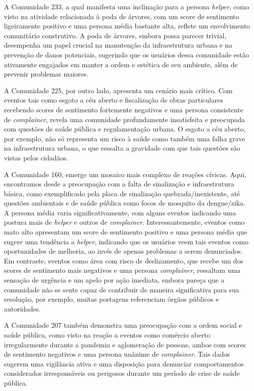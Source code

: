 A Comunidade 233, a qual manifesta uma inclinação para a persona \textit{helper}, como visto na atividade relacionada à poda de árvores, com um score de sentimento ligeiramente positivo e uma persona média bastante alta, reflete um envolvimento comunitário construtivo. A poda de árvores, embora possa parecer trivial, desempenha um papel crucial na manutenção da infraestrutura urbana e na prevenção de danos potenciais, sugerindo que os usuários dessa comunidade estão ativamente engajados em manter a ordem e estética de seu ambiente, além de prevenir problemas maiores.

A Comunidade 225, por outro lado, apresenta um cenário mais crítico. Com eventos tais como esgoto a céu aberto e fiscalização de obras particulares recebendo scores de sentimento fortemente negativos e uma persona consistente de \textit{complainer}, revela uma comunidade profundamente insatisfeita e preocupada com questões de saúde pública e regulamentação urbana. O esgoto a céu aberto, por exemplo, não só representa um risco à saúde como também uma falha grave na infraestrutura urbana, o que ressalta a gravidade com que tais questões são vistas pelos cidadãos.

A Comunidade 160, emerge um mosaico mais complexo de reações cívicas. Aqui, encontramos desde a preocupação com a falta de sinalização e infraestrutura básica, como exemplificado pela placa de sinalização quebrada/inexistente, até questões ambientais e de saúde pública como focos de mosquito da dengue/zika. A persona média varia significativamente, com alguns eventos indicando uma postura mais de \textit{helper} e outros de \textit{complainer}. Interessantemente, eventos como mato alto apresentam um score de sentimento positivo e uma persona média que sugere uma tendência a \textit{helper}, indicando que os usuários veem tais eventos como oportunidades de melhoria, ao invés de apenas problemas a serem denunciados. Em contraste, eventos como área com risco de deslizamento, que recebe um dos scores de sentimento mais negativos e uma persona \textit{complainer}, ressaltam uma sensação de urgência e um apelo por ação imediata, embora pareça que a comunidade não se sente capaz de contribuir de maneira significativa para sua resolução, por exemplo, muitas postagens referenciam órgãos públicos e autoridades.

A Comunidade 207 também demonstra uma preocupação com a ordem social e saúde pública, como visto na reação a eventos como comércio aberto irregularmente durante a pandemia e aglomeração de pessoas, ambos com scores de sentimento negativos e uma persona unânime de \textit{complainer}. Tais dados sugerem uma vigilância ativa e uma disposição para denunciar comportamentos considerados irresponsáveis ou perigosos durante um período de crise de saúde pública.

